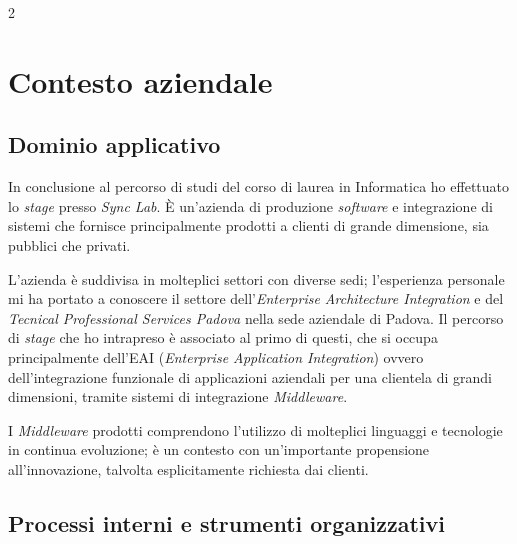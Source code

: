 2\chapter{Contesto aziendale}

\section{Dominio applicativo}
In conclusione al percorso di studi del corso di laurea in Informatica ho effettuato lo \textit{stage} presso \textit{Sync Lab}.
È un'azienda di produzione \textit{software} e integrazione di sistemi che fornisce principalmente prodotti a clienti di grande dimensione, sia pubblici che privati.

L'azienda è suddivisa in molteplici settori con diverse sedi; l'esperienza personale mi ha portato a conoscere il settore dell'\textit{Enterprise Architecture Integration} e del \textit{Tecnical Professional Services Padova} nella sede aziendale di Padova.
Il percorso di \textit{stage} che ho intrapreso è associato al primo di questi, che si occupa principalmente dell'EAI (\textit{Enterprise Application Integration}) ovvero dell'integrazione funzionale di applicazioni aziendali per una clientela di grandi dimensioni, tramite sistemi di integrazione \textit{Middleware}.

I \textit{Middleware} prodotti comprendono l'utilizzo di molteplici linguaggi e tecnologie in continua evoluzione; è un contesto con un'importante propensione all'innovazione, talvolta esplicitamente richiesta dai clienti.

\section{Processi interni e strumenti organizzativi}

%


